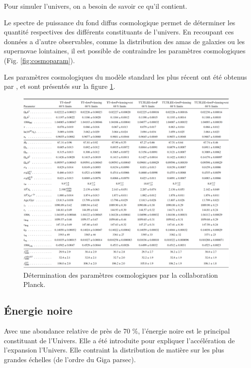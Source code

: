 Pour simuler l'univers, on a besoin de savoir ce qu'il contient.


Le spectre de puissance du fond diffus cosmologique permet de déterminer les quantité respectives des différents constituants de l'univers.
En recoupant ces données a d'autre observables, comme la distribution des amas de galaxies ou les supernovae lointaines, il est possible de contraindre les paramètres cosmologiques (Fig. \ref{fig:cosmoparam}).

Les paramètres cosmologiques du modèle standard les plus récent ont été obtenus par \cite{planck_collaboration_planck_2016}, et sont présentés sur la figure \ref{fig:planck_parameters}.





\begin{figure}[bth]
        \includegraphics[width=.95\linewidth]{img/01/table_planck.pdf} 
        \caption{Détermination des paramètres cosmologiques par la collaboration Planck.}
 		\label{fig:planck_parameters}
\end{figure}



\subsection{Énergie noire}
Avec une abondance relative de près de 70 \%, l'énergie noire est le principal constituant de l'Univers.
Elle a été introduite pour expliquer l'accélération de l'expansion l'Univers.
Elle contraint la distribution de matière sur les plus grandes échelles (de l'ordre du Giga parsec).

